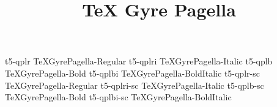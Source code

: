\documentclass[test]{vnsample}
\title{TeX Gyre Pagella}
\begin{document}
\begin{shortsample}
    {t5-qplr}     {TeXGyrePagella-Regular}
   {t5-qplri}    {TeXGyrePagella-Italic}
    {t5-qplb}     {TeXGyrePagella-Bold}
   {t5-qplbi}    {TeXGyrePagella-BoldItalic}
   {t5-qplr-sc}  {TeXGyrePagella-Regular}
 {t5-qplri-sc} {TeXGyrePagella-Italic}
   {t5-qplb-sc}  {TeXGyrePagella-Bold}
 {t5-qplbi-sc} {TeXGyrePagella-BoldItalic}
\end{shortsample}
\end{document}
